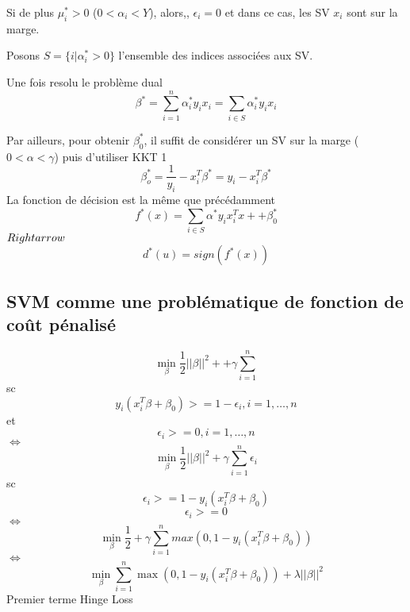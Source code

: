 \documentclass{article}
\begin{document}
 Si de plus $\mu_i^*>0$ ($0<\alpha_i<Y$), alors,, $\epsilon_i=0$ et dans ce cas, les SV $x_i$ sont sur la marge.
 
 Posons $S=\{i|\alpha_i^*>0\}$ l'ensemble des indices associ\'ees  aux SV.
 
 Une fois resolu le probl\`eme dual
\begin{equation}
\beta^*=\sum_{i=1}^n\alpha_i^*y_ix_i=\sum_{i\in S}\alpha_i^*y_ix_i
\end{equation}

Par ailleurs, pour obtenir $\beta_0^*$, il suffit de consid\'erer un SV sur la marge ($0<\alpha<\gamma$) puis d'utiliser KKT 1
\begin{equation}
\beta_o^*=\frac{1}{y_i}-x_i^T\beta^*=y_i-x_i^T\beta^*
\end{equation}
La fonction de d\'ecision est la  m\^eme que pr\'ec\'edamment
\begin{equation}
f^*(x)=\sum_{i\in S}\alpha^*y_ix_i^Tx++\beta_0^*
\end{equation}
$\\Rightarrow$
\begin{equation}
d^*(u)=sign(f^*(x))
\end{equation}
\subsection{SVM comme une probl\'ematique de fonction de co\^ut p\'enalis\'e}
\begin{equation}
\min_\beta\frac{1}{2}||\beta||^2++\gamma\sum_{i=1}^n
\end{equation}
sc
\begin{equation}
y_i(x_i^T\beta+\beta_0)>=1-\epsilon_i, i=1,\ldots,n
\end{equation}
et
\begin{equation}
\epsilon_i>=0,  i=1,\ldots,n
\end{equation}
$\Leftrightarrow$
\begin{equation}
\min_\beta \frac{1}{2}||\beta||^2+\gamma\sum_{i=1}^n\epsilon_i
\end{equation}
sc
\begin{equation}
\epsilon_i>=1-y_i(x_i^T\beta+\beta_0)
\end{equation}
\begin{equation}
\epsilon_i>=0
\end{equation}
$\Leftrightarrow$
\begin{equation}
\min_\beta\frac{1}{2}+\gamma\sum_{i=1}^nmax(0,1-y_i(x_i^T\beta+\beta_0))
\end{equation}
$\Leftrightarrow$
\begin{equation}
\min_\beta\sum_{i=1}^n\max(0,1-y_i(x_i^T\beta+\beta_0))+\lambda||\beta||^2
\end{equation}
Premier terme Hinge Loss
\end{document}
